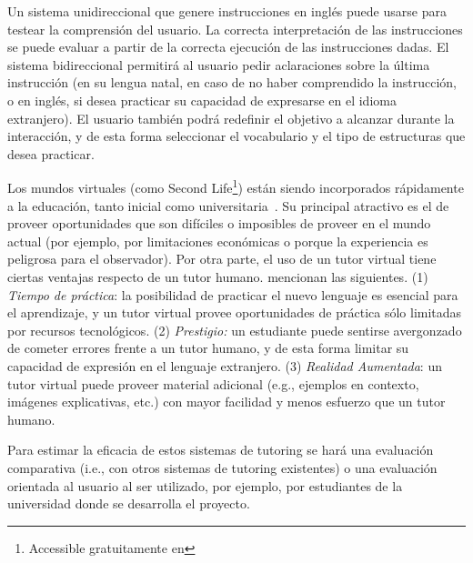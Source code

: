 Un sistema unidireccional que genere instrucciones en ingl\'es puede
usarse para testear la comprensi\'on del usuario.  La correcta
interpretaci\'on de las instrucciones se puede evaluar a partir de la
correcta ejecuci\'on de las instrucciones dadas.  El sistema
bidireccional permitir\'a al usuario pedir aclaraciones sobre la
\'ultima instrucci\'on (en su lengua natal, en caso de no haber comprendido
la instrucci\'on, o en ingl\'es, si desea practicar su
capacidad de expresarse en el idioma extranjero).  El usuario tambi\'en
podr\'a redefinir el objetivo a alcanzar durante la interacci\'on, y
de esta forma seleccionar el vocabulario y el tipo de estructuras que desea
practicar.

Los mundos virtuales (como Second Life\footnote{Accessible gratuitamente
en }) est\'an siendo incorporados r\'apidamente a la educaci\'on, tanto inicial como universitaria~\citep{Doswell05,molk:lear09}.  Su principal atractivo
es el de proveer oportunidades que son dif\'iciles o imposibles de
proveer en el mundo actual (por ejemplo, por limitaciones econ\'omicas
o porque la experiencia es peligrosa para el observador).
Por otra parte, el uso de un tutor virtual tiene ciertas ventajas
respecto de un tutor humano. \cite{engwall1020} mencionan las siguientes. (1) \emph{Tiempo de
pr\'actica}: la posibilidad de practicar el nuevo lenguaje es esencial
para el aprendizaje, y un tutor virtual provee oportunidades de pr\'actica
s\'olo limitadas por recursos tecnol\'ogicos. (2) \emph{Prestigio:} un
estudiante puede sentirse avergonzado de cometer errores frente a un tutor
humano, y de esta forma limitar su capacidad de expresi\'on en el lenguaje
extranjero. (3) \emph{Realidad Aumentada}: un tutor virtual puede proveer
material adicional (e.g., ejemplos en contexto, im\'agenes explicativas, etc.) con mayor facilidad y menos esfuerzo que un tutor humano.


Para estimar la eficacia de estos sistemas de tutoring se har\'a una
evaluaci\'on comparativa (i.e., con otros
sistemas de tutoring existentes) o una evaluaci\'on orientada al usuario al ser
utilizado, por ejemplo, por estudiantes de la universidad donde se desarrolla el
proyecto.













